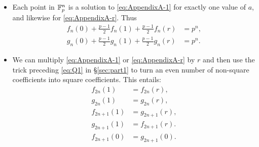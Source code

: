 \begin{itemize}
	\item Each point in $\mathbb{F}_p^n$ is a solution to \eqref{eq:AppendixA-1} for exactly one value of $a$, and likewise for \eqref{eq:AppendixA-r}. Thus
	\begin{align*}
		f_n(0) + \frac{p-1}{2}f_n(1) + \frac{p-1}{2}f_n(r) &= p^n,\\
		g_n(0) + \frac{p-1}{2}g_n(1) + \frac{p-1}{2}g_n(r) &= p^n.
	\end{align*}
	\item We can multiply \eqref{eq:AppendixA-1} or \eqref{eq:AppendixA-r} by $r$ and then use the trick preceding \eqref{eq:Q1} in \S\ref{sec:part1} to turn an even number of non-square coefficients into square coefficients. This entails:
	\begin{align*}
		f_{2n}(1) &= f_{2n}(r),\\
		g_{2n}(1) &= g_{2n}(r),\\
		f_{2n+1}(1) &= g_{2n+1}(r),\\
		g_{2n+1}(1) &= f_{2n+1}(r).\\
		f_{2n+1}(0) &= g_{2n+1}(0).
	\end{align*}
\end{itemize}